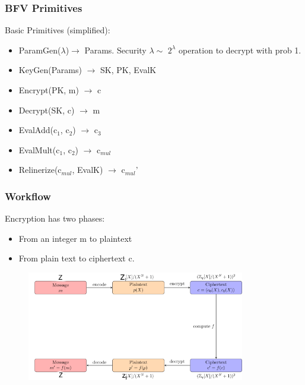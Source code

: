 \documentclass[10pt,handout]{beamer}
\begin{document}


\begin{frame}
\frametitle{BFV Primitives}

    Basic Primitives (simplified):
\begin{itemize}
    \item ParamGen($\lambda$)$\rightarrow$ Params. Security $\lambda \sim$ $2^\lambda$ operation to decrypt with prob 1.
    \item KeyGen(Params) $\rightarrow$ SK, PK, EvalK
    \item Encrypt(PK, m) $\rightarrow$ c
    \item Decrypt(SK, c) $\rightarrow$ m
    \item EvalAdd(c$_1$, c$_2$) $\rightarrow$ c$_3$
    \item EvalMult(c$_1$, c$_2$) $\rightarrow$ c$_{mul}$
    \item Relinerize(c$_{mul}$, EvalK) $\rightarrow$ c$_{mul}$'
\end{itemize}

\end{frame}



\begin{frame}
\frametitle{Workflow}

    Encryption has two phases:
\begin{itemize}
    \item From an integer m to plaintext
    \item From plain text to ciphertext c.
\end{itemize}


\begin{figure}
    \includegraphics[width=0.85\textwidth]{bfv-diagram.png}
\end{figure}


\end{frame}
\end{document}
